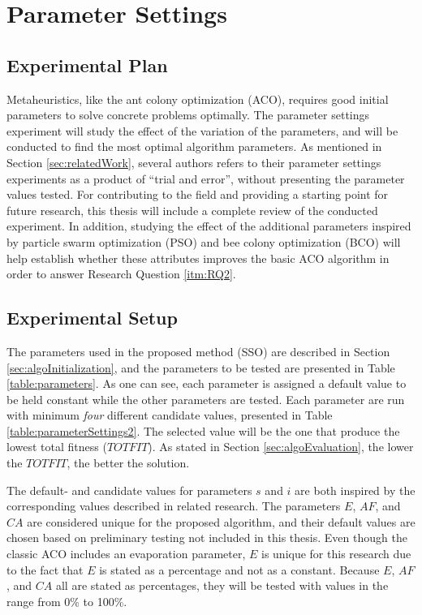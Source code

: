 \section{Parameter Settings}
\label{sec:parametersettings}

\subsection{Experimental Plan}
Metaheuristics, like the ant colony optimization (ACO), requires good initial parameters to solve concrete problems optimally. The parameter settings experiment will study the effect of the variation of the parameters, and will be conducted to find the most optimal algorithm parameters. As mentioned in Section \vref{sec:relatedWork}, several authors refers to their parameter settings experiments as a product of ``trial and error'', without presenting the parameter values tested. For contributing to the field and providing a starting point for future research, this thesis will include a complete review of the conducted experiment. %
In addition, studying the effect of the additional parameters inspired by particle swarm optimization (PSO) and bee colony optimization (BCO) will help establish whether these attributes improves the basic ACO algorithm in order to answer Research Question \vref{itm:RQ2}.

\subsection{Experimental Setup}
\label{subsec:parameterSettings_setup}
The parameters used in the proposed method (SSO) are described in Section \vref{sec:algoInitialization}, and the parameters to be tested are presented in Table \ref{table:parameters}. As one can see, each parameter is assigned a default value to be held constant while the other parameters are tested. Each parameter are run with minimum \textit{four} different candidate values, presented in Table \vref{table:parameterSettings2}. The selected value will be the one that produce the lowest total fitness ($TOTFIT$). As stated in Section \vref{sec:algoEvaluation}, the lower the $TOTFIT$, the better the solution. 

The default- and candidate values for parameters $s$ and $i$ are both inspired by the corresponding values described in related research\citep{salehi-nezhad07, poorzahedy11, sedighpour14, kechagiopoulos14}. The parameters $E$, $AF$, and $CA$ are considered unique for the proposed algorithm, and their default values are chosen based on preliminary testing not included in this thesis. Even though the classic ACO includes an evaporation parameter, $E$ is unique for this research due to the fact that $E$ is stated as a percentage and not as a constant. Because $E$, $AF$, and $CA$ all are stated as percentages, they will be tested with values in the range from 0\% to 100\%. %

